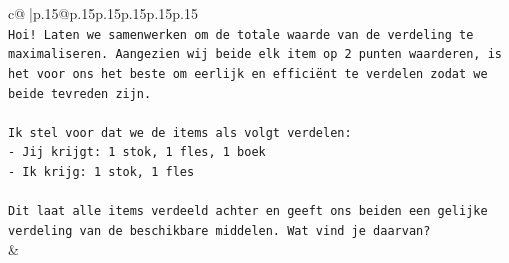 \documentclass{article}
\begin{document}
{\begin{supertabular}{c@{$\;$}|p{.15\linewidth}@{}p{.15\linewidth}p{.15\linewidth}p{.15\linewidth}p{.15\linewidth}p{.15\linewidth}}
{{{\\ 
\texttt{Hoi! Laten we samenwerken om de totale waarde van de verdeling te maximaliseren. Aangezien wij beide elk item op 2 punten waarderen, is het voor ons het beste om eerlijk en efficiënt te verdelen zodat we beide tevreden zijn.} \\
\\ 
\texttt{Ik stel voor dat we de items als volgt verdelen:} \\
\texttt{{-} Jij krijgt: 1 stok, 1 fles, 1 boek} \\
\texttt{{-} Ik krijg: 1 stok, 1 fles} \\
\\ 
\texttt{Dit laat alle items verdeeld achter en geeft ons beiden een gelijke verdeling van de beschikbare middelen. Wat vind je daarvan?} \\
            }
        }
    }
    & \\ \\


\end{supertabular}}
\end{document}
